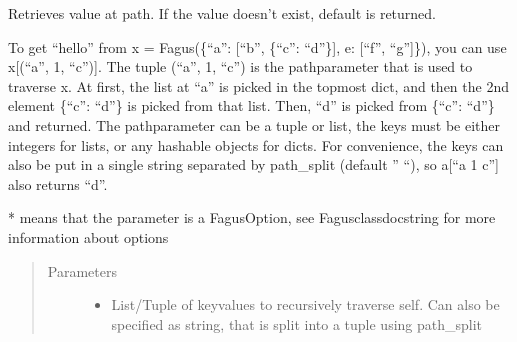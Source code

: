 \documentclass[a4paper,10pt,english]{sphinxmanual}
\begin{document}
\begin{fulllineitems}
\begin{fulllineitems}
\label{\detokenize{fagus:fagus.Fagus.get}}
\pysigstartsignatures
{}
\pysigstopsignatures
\sphinxAtStartPar
Retrieves value at path. If the value doesn’t exist, default is returned.

\sphinxAtStartPar
To get “hello” from x = Fagus(\{“a”: {[}“b”, \{“c”: “d”\}{]}, e: {[}“f”, “g”{]}\}), you can use x{[}(“a”, 1, “c”){]}. The tuple
(“a”, 1, “c”) is the path\sphinxhyphen{}parameter that is used to traverse x. At first, the list at “a” is picked in the
top\sphinxhyphen{}most dict, and then the 2nd element \{“c”: “d”\} is picked from that list. Then, “d” is picked from \{“c”: “d”\}
and returned. The path\sphinxhyphen{}parameter can be a tuple or list, the keys must be either integers for lists, or any
hashable objects for dicts. For convenience, the keys can also be put in a single string separated by
path\_split (default ” “), so a{[}“a 1 c”{]} also returns “d”.

\sphinxAtStartPar
* means that the parameter is a FagusOption, see Fagus\sphinxhyphen{}class\sphinxhyphen{}docstring for more information about options
\begin{quote}\begin{description}
\item[{Parameters}] \leavevmode\begin{itemize}
\item {}
\sphinxAtStartPar
{} \textendash{} List/Tuple of key\sphinxhyphen{}values to recursively traverse self. Can also be specified as string, that is split
into a tuple using path\_split


\end{itemize}
\end{description}
\end{quote}
\end{fulllineitems}
\end{fulllineitems}
\end{document}
